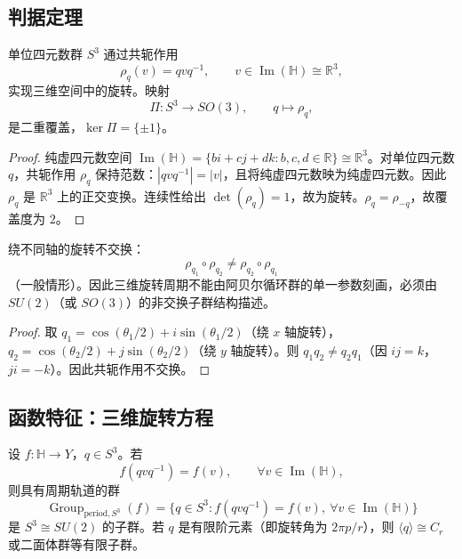 \subsection{\texorpdfstring{判据定理}{判据定理}}

\begin{theorem}[三维旋转代数化判据]\label{thm:quaternion_rotation_criterion}
单位四元数群 $S^3$ 通过共轭作用
\[
\rho_q(v) = q v q^{-1},\qquad v \in \operatorname{Im}(\mathbb{H}) \cong \mathbb{R}^3,
\]
实现三维空间中的旋转。映射
\[
\Pi: S^3 \to SO(3),\qquad q \mapsto \rho_q,
\]
是二重覆盖，$\ker \Pi = \{\pm 1\}$。
\end{theorem}

\begin{proof}
纯虚四元数空间 $\operatorname{Im}(\mathbb{H}) = \{bi + cj + dk : b,c,d \in \mathbb{R}\} \cong \mathbb{R}^3$。对单位四元数 $q$，共轭作用 $\rho_q$ 保持范数：$|qvq^{-1}| = |v|$，且将纯虚四元数映为纯虚四元数。因此 $\rho_q$ 是 $\mathbb{R}^3$ 上的正交变换。连续性给出 $\det(\rho_q) = 1$，故为旋转。$\rho_q = \rho_{-q}$，故覆盖度为 $2$。
\end{proof}

\begin{theorem}[非交换周期判据]\label{thm:noncommutative_period}
绕不同轴的旋转不交换：
\[
\rho_{q_1} \circ \rho_{q_2} \neq \rho_{q_2} \circ \rho_{q_1}
\]
（一般情形）。因此三维旋转周期不能由阿贝尔循环群的单一参数刻画，必须由 $SU(2)$（或 $SO(3)$）的非交换子群结构描述。
\end{theorem}

\begin{proof}
取 $q_1 = \cos(\theta_1/2) + i\sin(\theta_1/2)$（绕 $x$ 轴旋转），$q_2 = \cos(\theta_2/2) + j\sin(\theta_2/2)$（绕 $y$ 轴旋转）。则 $q_1 q_2 \neq q_2 q_1$（因 $ij = k$，$ji = -k$）。因此共轭作用不交换。
\end{proof}

\subsection{\texorpdfstring{函数特征：三维旋转方程}{函数特征：三维旋转方程}}

\begin{theorem}[四元数旋转方程的具有周期轨道的群]\label{thm:rotation_equation_H}
设 $f:\mathbb{H}\to Y$，$q\in S^3$。若
\[
f(qvq^{-1})=f(v),\qquad \forall v\in\operatorname{Im}(\mathbb{H}),
\]
则具有周期轨道的群
\[
\operatorname{Group}_{\mathrm{period},S^3}(f)=\{q\in S^3: f(qvq^{-1})=f(v),\ \forall v\in\operatorname{Im}(\mathbb{H})\}
\]
是 $S^3\cong SU(2)$ 的子群。若 $q$ 是有限阶元素（即旋转角为 $2\pi p/r$），则 $\langle q\rangle\cong C_r$ 或二面体群等有限子群。
\end{theorem}

